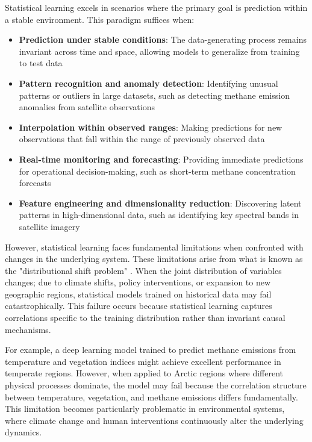 Statistical learning excels in scenarios where the primary goal is prediction within a stable environment. This paradigm suffices when:

\begin{itemize}
	\item \textbf{Prediction under stable conditions}: The data-generating process remains invariant across time and space, allowing models to generalize from training to test data
	\item \textbf{Pattern recognition and anomaly detection}: Identifying unusual patterns or outliers in large datasets, such as detecting methane emission anomalies from satellite observations
	\item \textbf{Interpolation within observed ranges}: Making predictions for new observations that fall within the range of previously observed data
	\item \textbf{Real-time monitoring and forecasting}: Providing immediate predictions for operational decision-making, such as short-term methane concentration forecasts
	\item \textbf{Feature engineering and dimensionality reduction}: Discovering latent patterns in high-dimensional data, such as identifying key spectral bands in satellite imagery
\end{itemize}

However, statistical learning faces fundamental limitations when confronted with changes in the underlying system. These limitations arise from what is known as the "distributional shift problem" \cite{Quinonero-Candela2009}. When the joint distribution of variables changes; due to climate shifts, policy interventions, or expansion to new geographic regions, statistical models trained on historical data may fail catastrophically. This failure occurs because statistical learning captures correlations specific to the training distribution rather than invariant causal mechanisms.

For example, a deep learning model trained to predict methane emissions from temperature and vegetation indices might achieve excellent performance in temperate regions. However, when applied to Arctic regions where different physical processes dominate, the model may fail because the correlation structure between temperature, vegetation, and methane emissions differs fundamentally. This limitation becomes particularly problematic in environmental systems, where climate change and human interventions continuously alter the underlying dynamics.

